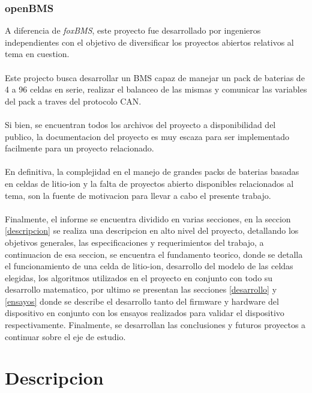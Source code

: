 \documentclass[10pt,a4paper]{article}
\begin{document}
    \clearpage

    \subsubsection{openBMS}

    \noindent A diferencia de \emph{foxBMS}, este proyecto fue desarrollado por 
    ingenieros independientes con el objetivo de diversificar los proyectos 
    abiertos relativos al tema en cuestion.\\
    \\
    \noindent Este projecto busca desarrollar un BMS capaz de manejar un pack 
    de baterias de 4 a 96 celdas en serie, realizar el balanceo de las mismas y 
    comunicar las variables del pack a traves del protocolo CAN.\\
    \\
    \noindent Si bien, se encuentran todos los archivos del proyecto a 
    disponibilidad del publico, la documentacion del proyecto es muy escaza 
    para ser implementado facilmente para un proyecto relacionado.\\
    \\
    \noindent En definitiva, la complejidad en el manejo de grandes packs de 
    baterias basadas en celdas de litio-ion y la falta de proyectos abierto 
    disponibles relacionados al tema, son la fuente de motivacion para 
    llevar a cabo el presente trabajo.\\
    \\
    Finalmente, el informe se encuentra dividido en varias secciones, en la
    seccion \ref{descripcion} se realiza una descripcion en alto nivel del
    proyecto, detallando los objetivos generales, las especificaciones y
    requerimientos del trabajo, a continuacion de esa seccion, se encuentra el
    fundamento teorico, donde se detalla el funcionamiento de una celda de
    litio-ion, desarrollo del modelo de las celdas elegidas, los algoritmos 
    utilizados en el proyecto en conjunto con todo su desarrollo matematico, por
    ultimo se presentan las secciones \ref{desarrollo} y \ref{ensayos} donde se
    describe el desarrollo tanto del firmware y hardware del dispositivo en
    conjunto con los ensayos realizados para validar el dispositivo
    respectivamente. Finalmente, se desarrollan las conclusiones y futuros
    proyectos a continuar sobre el eje de estudio.
	
	\clearpage
	
	\section{Descripcion}
	
\end{document}
